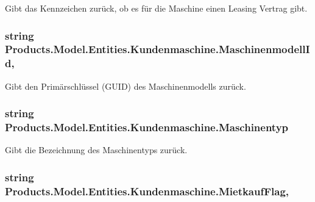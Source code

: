 Gibt das Kennzeichen zurück, ob es für die Maschine einen Leasing Vertrag gibt. 

\subsubsection[{\texorpdfstring{Maschinenmodell\+Id}{MaschinenmodellId}}]{\setlength{\rightskip}{0pt plus 5cm}string Products.\+Model.\+Entities.\+Kundenmaschine.\+Maschinenmodell\+Id\hspace{0.3cm}{\ttfamily [get]}, {\ttfamily [set]}}\hypertarget{class_products_1_1_model_1_1_entities_1_1_kundenmaschine_ad063c385de54aa0d88a0687f4381451a}{}\label{class_products_1_1_model_1_1_entities_1_1_kundenmaschine_ad063c385de54aa0d88a0687f4381451a}


Gibt den Primärschlüssel (G\+U\+ID) des Maschinenmodells zurück. 

\subsubsection[{\texorpdfstring{Maschinentyp}{Maschinentyp}}]{\setlength{\rightskip}{0pt plus 5cm}string Products.\+Model.\+Entities.\+Kundenmaschine.\+Maschinentyp\hspace{0.3cm}{\ttfamily [get]}}\hypertarget{class_products_1_1_model_1_1_entities_1_1_kundenmaschine_a0a787c4f799fde2242d771ea52507967}{}\label{class_products_1_1_model_1_1_entities_1_1_kundenmaschine_a0a787c4f799fde2242d771ea52507967}


Gibt die Bezeichnung des Maschinentyps zurück. 

\subsubsection[{\texorpdfstring{Mietkauf\+Flag}{MietkaufFlag}}]{\setlength{\rightskip}{0pt plus 5cm}string Products.\+Model.\+Entities.\+Kundenmaschine.\+Mietkauf\+Flag\hspace{0.3cm}{\ttfamily [get]}, {\ttfamily [set]}}\hypertarget{class_products_1_1_model_1_1_entities_1_1_kundenmaschine_a4d68b1b90ecca9a8028e5eb6a79f790e}{}\label{class_products_1_1_model_1_1_entities_1_1_kundenmaschine_a4d68b1b90ecca9a8028e5eb6a79f790e}


